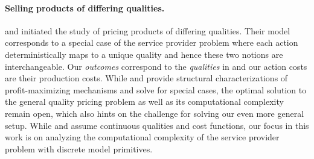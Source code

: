 
\paragraph{Selling products of differing qualities.}

\citet{mussa1978monopoly} and \citet{maskin1984monopoly} initiated the study of pricing products of differing qualities. Their model corresponds to a special case of the service provider problem where each action deterministically maps to a unique quality and hence these two notions are interchangeable. Our \emph{outcomes} correspond to the \emph{qualities} in \citep{mussa1978monopoly} and our action costs are their production costs. While \citet{mussa1978monopoly} and \citet{maskin1984monopoly} provide structural characterizations of profit-maximizing mechanisms and solve for special cases, the optimal solution to the general quality pricing problem as well as its computational complexity remain open, which also hints on the challenge for solving our even more general setup. While \citet{mussa1978monopoly} and \citet{maskin1984monopoly} assume continuous qualities and cost functions, our focus in this work is on analyzing the computational complexity of the service provider problem with discrete model primitives.
